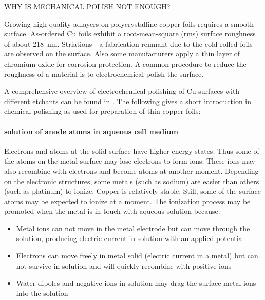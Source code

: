WHY IS MECHANICAL POLISH NOT ENOUGH?

Growing high quality adlayers on polycrystalline copper foils requires a smooth surface. As-ordered Cu foils exhibit a root-mean-square (rms) surface roughness of about \SI{218}{\nm}\cite{bin_zhang_low-temperature_2012}. Striations - a fabrication remnant due to the cold rolled foils - are observed on the surface\cite{kim_synthesis_2012-1}. Also some manufacturers apply a thin layer of chromium oxide for corrosion protection\cite{bin_zhang_low-temperature_2012}. A common procedure to reduce the roughness of a material is to electrochemical polish the surface.

A comprehensive overview of  electrochemical polishing of Cu surfaces with different etchants can be found in \cite{jinshan_electrochemical_2004}. The following gives a short introduction in chemical polishing as used for preparation of thin copper foils:

\paragraph{solution of anode atoms in aqueous cell medium}
Electrons and atoms at the solid surface have higher energy states. Thus some of the atoms on the metal surface may lose electrons to form ions. These ions may also recombine with electrons and become atoms at another moment. Depending on the electronic structures, some metals (such as sodium) are easier than others (such as platinum) to ionize. Copper is relatively stable. Still, some of the surface atoms may be expected to ionize at a moment. The ionization process may be promoted when the metal is in touch with aqueous solution because: 
\begin{itemize}
 \item Metal ions can not move in the metal electrode but can move through the solution, producing electric current in solution with an applied potential
 \item Electrons can move freely in metal solid (electric current in a metal) but can not survive in solution and will quickly recombine with positive ions
 \item Water dipoles and negative ions in solution may drag the surface metal ions into the solution
\end{itemize}

